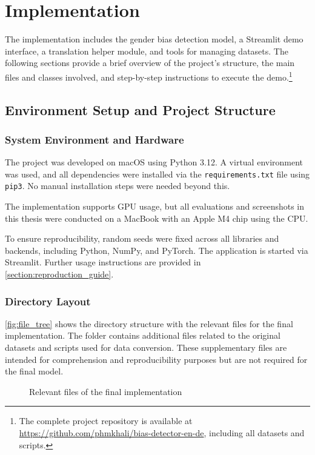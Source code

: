 \chapter{Implementation}
The implementation includes the gender bias detection model, a Streamlit demo interface, a translation helper module, and tools for managing datasets. The following sections provide a brief overview of the project’s structure, the main files and classes involved, and step-by-step instructions to execute the demo.\footnote{The complete project repository is available at \url{https://github.com/phmkhali/bias-detector-en-de}, including all datasets and scripts.}

\section{Environment Setup and Project Structure}
    \subsection{System Environment and Hardware}
    The project was developed on macOS using Python 3.12. A virtual environment was used, and all dependencies were installed via the \texttt{requirements.txt} file using \texttt{pip3}. No manual installation steps were needed beyond this.

    The implementation supports GPU usage, but all evaluations and screenshots in this thesis were conducted on a MacBook with an Apple M4 chip using the CPU.

    To ensure reproducibility, random seeds were fixed across all libraries and backends, including Python, NumPy, and PyTorch. The application is started via Streamlit. Further usage instructions are provided in \autoref{section:reproduction_guide}.


\subsection{Directory Layout}
    \autoref{fig:file_tree} shows the directory structure with the relevant files for the final implementation. The folder contains additional files related to the original datasets and scripts used for data conversion. These supplementary files are intended for comprehension and reproducibility purposes but are not required for the final model.

    \vspace{0.8em} 
    \begin{figure}[htb]
        \centering
        \scalebox{0.8}{}
        \caption[Relevant files of the final implementation]{Relevant files of the final implementation}
        \label{fig:file_tree}
    \end{figure}
    \vspace{0.8em} 


